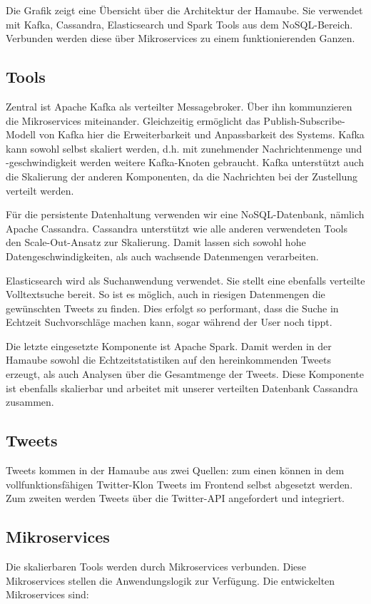 Die Grafik zeigt eine Übersicht über die Architektur der Hamaube. Sie
verwendet mit Kafka, Cassandra, Elasticsearch und Spark Tools aus dem
NoSQL-Bereich. Verbunden werden diese über Mikroservices zu einem
funktionierenden Ganzen.

\subsection{Tools}
Zentral ist Apache Kafka als verteilter Messagebroker. Über ihn
kommunzieren die Mikroservices miteinander. Gleichzeitig ermöglicht das
Publish-Subscribe-Modell von Kafka hier die Erweiterbarkeit und
Anpassbarkeit des Systems. Kafka  kann sowohl selbst skaliert werden,
d.h. mit zunehmender Nachrichtenmenge und -geschwindigkeit werden
weitere Kafka-Knoten gebraucht. Kafka unterstützt auch die Skalierung
der anderen Komponenten, da die Nachrichten bei der Zustellung verteilt
werden.

Für die persistente Datenhaltung verwenden wir eine NoSQL-Datenbank, nämlich
Apache Cassandra. Cassandra unterstützt wie alle anderen verwendeten
Tools den Scale-Out-Ansatz zur Skalierung. Damit lassen sich sowohl
hohe Datengeschwindigkeiten, als auch wachsende Datenmengen
verarbeiten.

Elasticsearch wird als Suchanwendung verwendet. Sie stellt eine
ebenfalls verteilte Volltextsuche bereit. So ist es möglich, auch in
riesigen Datenmengen die gewünschten Tweets zu finden. Dies erfolgt so
performant, dass die Suche in Echtzeit Suchvorschläge machen kann,
sogar während der User noch tippt.

Die letzte eingesetzte Komponente ist Apache Spark. Damit werden in der
Hamaube sowohl die Echtzeitstatistiken auf den hereinkommenden Tweets
erzeugt, als auch Analysen über die Gesamtmenge der Tweets. Diese
Komponente ist ebenfalls skalierbar und arbeitet mit unserer verteilten
Datenbank Cassandra zusammen.

\subsection{Tweets}
Tweets kommen in der Hamaube aus zwei Quellen: zum einen können in dem
vollfunktionsfähigen Twitter-Klon Tweets im Frontend selbst abgesetzt
werden. Zum zweiten werden Tweets über die Twitter-API angefordert und
integriert.

\subsection{Mikroservices}
Die skalierbaren Tools werden durch Mikroservices verbunden. Diese
Mikroservices stellen die Anwendungslogik zur Verfügung. Die
entwickelten Mikroservices sind:

